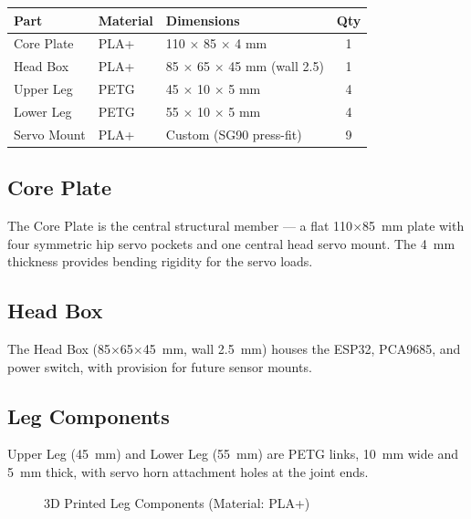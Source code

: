 \documentclass[12pt, a4paper]{article}
\begin{document}
\begin{center}
\begin{tabularx}{\textwidth}{|l|l|X|c|}
\hline
\textbf{Part}   & \textbf{Material} & \textbf{Dimensions}               & \textbf{Qty} \\
\hline
Core Plate      & PLA+  & 110 $\times$ 85 $\times$ 4 mm             & 1 \\
Head Box        & PLA+  & 85 $\times$ 65 $\times$ 45 mm (wall 2.5)  & 1 \\
Upper Leg       & PETG  & 45 $\times$ 10 $\times$ 5 mm              & 4 \\
Lower Leg       & PETG  & 55 $\times$ 10 $\times$ 5 mm              & 4 \\
Servo Mount     & PLA+  & Custom (SG90 press-fit)                  & 9 \\
\hline
\end{tabularx}
\end{center}

\subsection{Core Plate}

The Core Plate is the central structural member --- a flat 110$\times$85~mm plate
with four symmetric hip servo pockets and one central head servo mount. The
4~mm thickness provides bending rigidity for the servo loads.

\subsection{Head Box}

The Head Box (85$\times$65$\times$45~mm, wall 2.5~mm) houses the ESP32, PCA9685,
and power switch, with provision for future sensor mounts.

\subsection{Leg Components}

Upper Leg (45~mm) and Lower Leg (55~mm) are PETG links, 10~mm wide and 5~mm
thick, with servo horn attachment holes at the joint ends.

\begin{figure}[H]
  \centering
  \vspace{10cm}
  \caption{3D Printed Leg Components (Material: PLA+)}
  \label{fig:legs}
\end{figure}
\end{document}
